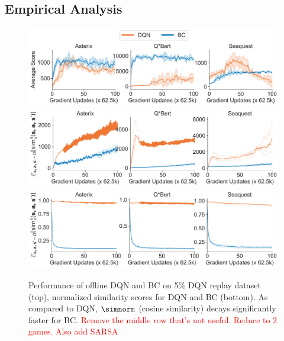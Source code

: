 \iffalse
\subsection{Empirical Analysis}
\label{sec:empirical_analysis}
\begin{figure}
    \vspace{-47pt}
    \centering
    \includegraphics[width=\linewidth]{atari/perf_3_games.pdf}
    \includegraphics[width=\linewidth]{atari/unnorm_3_games.pdf}
    \includegraphics[width=\linewidth]{atari/norm_3_games.pdf}
    \vspace{-0.65cm}
    \caption{\small{Performance of offline DQN and BC on 5\% DQN replay dataset~\citep{agarwal2019optimistic} (top), normalized similarity scores for DQN and BC (bottom). As compared to DQN, $\simnorm$ (cosine similarity) decays significantly faster for BC. 
    \textcolor{red}{Remove the middle row that's not useful. Reduce to 2 games. Also add SARSA}}
    } 
    \label{fig:atari_3_games}
    \vspace{-0.4cm}
\end{figure}
